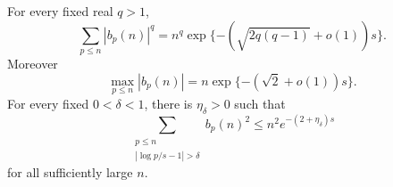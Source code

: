 \begin{theorem}\label{arith:moments}
For every fixed real $q>1$,
\begin{equation}\label{arith:moment-law}
 \sum_{p\le n}|b_p(n)|^q
 =n^q\exp\{-(\sqrt{2q(q-1)}+o(1))s\}.
\end{equation}
Moreover
\begin{equation}\label{arith:maximum}
 \max_{p\le n}|b_p(n)|
 =n\exp\{-(\sqrt2+o(1))s\}.
\end{equation}
For every fixed $0<\delta<1$, there is $\eta_\delta>0$ such that
\begin{equation}\label{arith:concentration}
 \sum_{\substack{p\le n\\|\log p/s-1|>\delta}}b_p(n)^2
 \le n^2e^{-(2+\eta_\delta)s}
\end{equation}
for all sufficiently large $n$.
\end{theorem}
